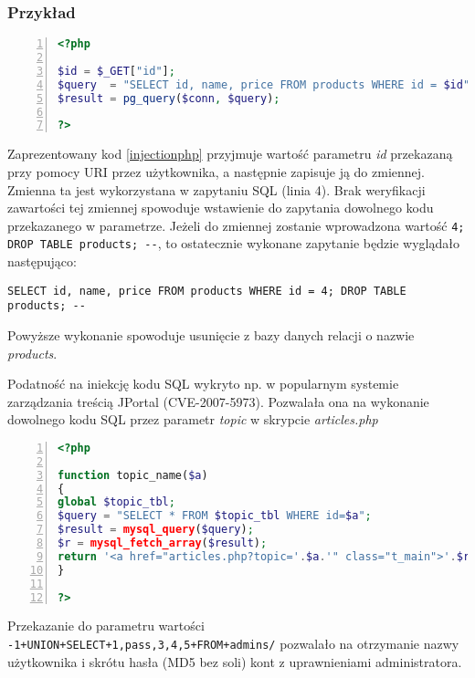 \documentclass[11pt,a4paper,polish,thesis,oneside]{dcsbook}
\begin{document}
\subsubsection*{Przykład}
\begin{lstlisting}[language=php,frame=single,caption=kod podatny na iniekcję,label=injectionphp,numbers=left]
<?php

$id = $_GET["id"];
$query  = "SELECT id, name, price FROM products WHERE id = $id";
$result = pg_query($conn, $query);

?>
\end{lstlisting}
Zaprezentowany kod \ref{injectionphp} przyjmuje wartość parametru \textit{id} przekazaną przy pomocy URI przez użytkownika, a następnie zapisuje ją do zmiennej. Zmienna ta jest wykorzystana w zapytaniu SQL (linia 4). Brak weryfikacji zawartości tej zmiennej spowoduje wstawienie do zapytania dowolnego kodu przekazanego w parametrze. Jeżeli do zmiennej zostanie wprowadzona wartość \lstinline[frame=single]|4; DROP TABLE products; --|, to ostatecznie wykonane zapytanie będzie wyglądało następująco: 
\begin{lstlisting}
SELECT id, name, price FROM products WHERE id = 4; DROP TABLE products; --
\end{lstlisting}
Powyższe wykonanie spowoduje usunięcie z bazy danych relacji o nazwie \textit{products}.

Podatność na iniekcję kodu SQL wykryto np. w popularnym systemie zarządzania treścią JPortal (CVE-2007-5973). Pozwalała ona na wykonanie dowolnego kodu SQL przez parametr \textit{topic} w skrypcie \textit{articles.php}

\begin{lstlisting}[language=php,frame=single,caption=podatność articles.php w systemie JPortal,label=injectionjportal,numbers=left]
<?php

function topic_name($a)  
{     
global $topic_tbl; 
$query = "SELECT * FROM $topic_tbl WHERE id=$a"; 
$result = mysql_query($query);   
$r = mysql_fetch_array($result);     
return '<a href="articles.php?topic='.$a.'" class="t_main">'.$r['title'].'</a>';   
} 

?>
\end{lstlisting}

Przekazanie do parametru wartości \lstinline|-1+UNION+SELECT+1,pass,3,4,5+FROM+admins/| pozwalało na otrzymanie nazwy użytkownika i skrótu hasła (MD5 bez soli) kont z uprawnieniami administratora.
\end{document}
